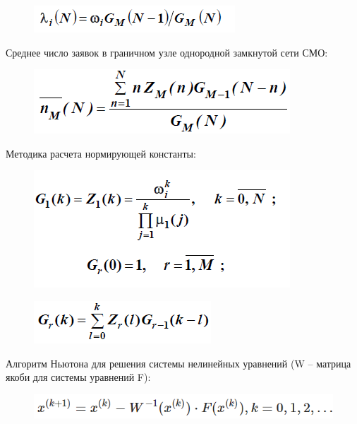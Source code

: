 \documentclass[14pt,a4paper,report]{report}
\begin{document}
\begin{figure}[h!]
	\centering
	\includegraphics[scale = 0.79]{images/5_1.png}
	\label{image:5_1}
\end{figure}

Среднее число заявок в граничном узле однородной замкнутой сети СМО:

\begin{figure}[h!]
	\centering
	\includegraphics[scale = 0.79]{images/5_2.png}
	\label{image:5_2}
\end{figure}

Методика расчета нормирующей константы:

\begin{figure}[h!]
	\centering
	\includegraphics[scale = 0.79]{images/5_4.png}
	\label{image:5_4}
\end{figure}

\begin{figure}[h!]
	\centering
	\includegraphics[scale = 0.79]{images/5_5.png}
	\label{image:5_5}
\end{figure}

Алгоритм Ньютона для решения системы нелинейных уравнений (W -- матрица якоби для системы уравнений F):

\begin{figure}[h!]
	\centering
	\includegraphics[scale = 0.70]{images/6_1.png}
	\label{image:6_1}
\end{figure}
\end{document}
